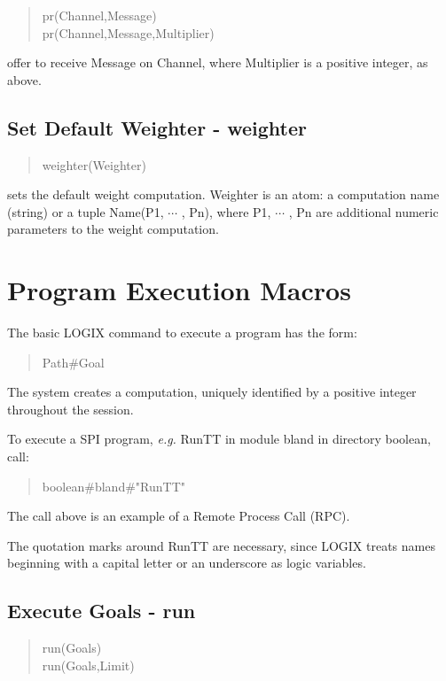 \begin{verse}
pr(Channel,Message) \\
pr(Channel,Message,Multiplier)
\end{verse}

\noindent
offer to receive Message on Channel, where Multiplier is a positive 
integer, as above.

\subsection{Set Default Weighter - weighter}
\label{weighter macro}
\begin{verse}
weighter(Weighter)
\end{verse}

\noindent
sets the default weight computation.  Weighter  is an atom: a computation name
(string) or a tuple  Name(P1, $\cdots$ , Pn), where P1, $\cdots$ , Pn
are additional numeric parameters to the weight computation.


\section{Program Execution Macros}
\label{macros}

The basic LOGIX command to execute a program has the form:

\begin{verse}
Path\#Goal
\end{verse}

\noindent
The system creates a computation, uniquely identified by a positive
integer throughout the session.

\noindent
To execute a SPI program, {\em e.g.} RunTT in module bland in directory
boolean, call:

\begin{verse}
    boolean\#bland\#"RunTT"
\end{verse}

\noindent
The call above is an example of a Remote Process Call (RPC).

\noindent
The quotation marks around RunTT are necessary, since LOGIX
treats names beginning with a capital letter or an underscore as logic
variables.

\subsection{Execute Goals - run}
\label{runners}

\begin{verse}
    run(Goals) \\
    run(Goals,Limit)
\end{verse}

